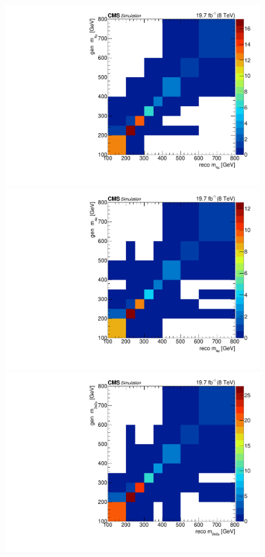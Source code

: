 \begin{figure}[hbtp]
  \begin{center}
    \includegraphics[width=\cmsFigWidth]{Figures/ResMat_qqggJJ_Mass_ZZTo4m_st_01_fr_Pow}
    \includegraphics[width=\cmsFigWidth]{Figures/ResMat_qqggJJ_Mass_ZZTo4e_st_01_fr_Pow}
    \includegraphics[width=\cmsFigWidth]{Figures/ResMat_qqggJJ_Mass_ZZTo2e2m_st_01_fr_Pow}     

\end{center}
\end{figure}
